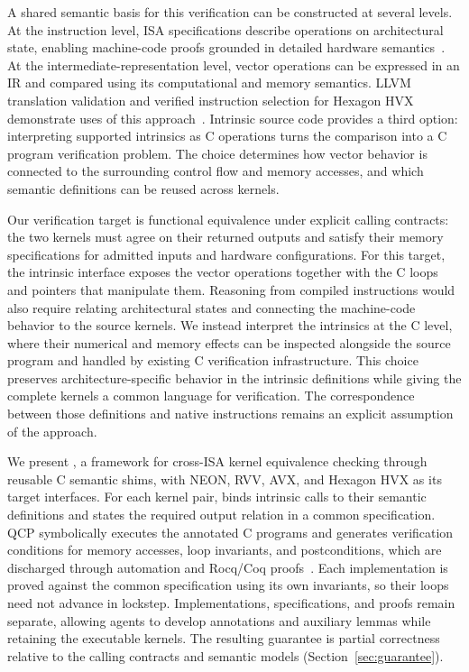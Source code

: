 A shared semantic basis for this verification can be constructed at several levels. At the instruction level, ISA specifications describe operations on architectural state, enabling machine-code proofs grounded in detailed hardware semantics~\cite{sail,islaris}. At the intermediate-representation level, vector operations can be expressed in an IR and compared using its computational and memory semantics. LLVM translation validation and verified instruction selection for Hexagon HVX demonstrate uses of this approach~\cite{alive2,rake}. Intrinsic source code provides a third option: interpreting supported intrinsics as C operations turns the comparison into a C program verification problem. The choice determines how vector behavior is connected to the surrounding control flow and memory accesses, and which semantic definitions can be reused across kernels.

Our verification target is functional equivalence under explicit calling contracts: the two kernels must agree on their returned outputs and satisfy their memory specifications for admitted inputs and hardware configurations. For this target, the intrinsic interface exposes the vector operations together with the C loops and pointers that manipulate them. Reasoning from compiled instructions would also require relating architectural states and connecting the machine-code behavior to the source kernels. We instead interpret the intrinsics at the C level, where their numerical and memory effects can be inspected alongside the source program and handled by existing C verification infrastructure. This choice preserves architecture-specific behavior in the intrinsic definitions while giving the complete kernels a common language for verification. The correspondence between those definitions and native instructions remains an explicit assumption of the approach.

We present \tool, a framework for cross-ISA kernel equivalence checking through reusable C semantic shims, with NEON, RVV, AVX, and Hexagon HVX as its target interfaces.  For each kernel pair, \tool binds intrinsic calls to their semantic definitions and states the required output relation in a common specification. QCP symbolically executes the annotated C programs and generates verification conditions for memory accesses, loop invariants, and postconditions, which are discharged through automation and Rocq/Coq proofs~\cite{qcp}. Each implementation is proved against the common specification using its own invariants, so their loops need not advance in lockstep. Implementations, specifications, and proofs remain separate, allowing agents to develop annotations and auxiliary lemmas while retaining the executable kernels. The resulting guarantee is partial correctness relative to the calling contracts and semantic models (Section~\ref{sec:guarantee}).

